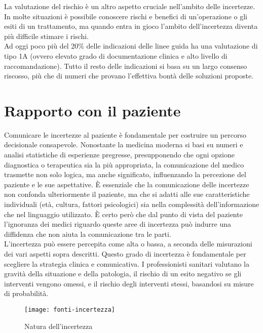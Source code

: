 La valutazione del rischio è un altro aspetto cruciale nell'ambito delle incertezze. In molte situazioni è possibile conoscere rischi e benefici di un'operazione o gli esiti di un trattamento, ma quando entra in gioco l'ambito dell'incertezza diventa più difficile stimare i rischi. \\
Ad oggi poco più del 20\% delle indicazioni delle linee guida ha una valutazione di tipo 1A (ovvero elevato grado di documentazione clinica e alto livello di raccomandazione). Tutto il resto delle indicazioni si basa su un largo consenso riscosso, più che di numeri che provano l'effettiva bontà delle soluzioni proposte. 


\section{Rapporto con il paziente}

Comunicare le incertezze al paziente è fondamentale per costruire un percorso decisionale consapevole. Nonostante la medicina moderna si basi su numeri e analisi statistiche di  esperienze pregresse, presupponendo che ogni opzione diagnostica o terapeutica sia la più appropriata, la comunicazione del medico trasmette non solo logica, ma anche significato, influenzando la percezione del paziente e le sue aspettative. È essenziale che la comunicazione delle incertezze non confonda ulteriormente il paziente, ma che si adatti alle sue caratteristiche individuali (età, cultura, fattori psicologici) sia nella complessità dell'informazione che nel linguaggio utilizzato. È certo però che dal punto di vista del paziente l'ignoranza dei medici riguardo queste aree di incertezza può indurre una diffidenza che non aiuta la comunicazione tra le parti. \\
L'incertezza può essere percepita come alta o bassa, a seconda delle misurazioni dei vari aspetti sopra descritti. Questo grado di incertezza è fondamentale per scegliere la strategia clinica e comunicativa. I professionisti sanitari valutano la gravità della situazione e della patologia, il rischio di un esito negativo se gli interventi vengono omessi, e il rischio degli interventi stessi, basandosi su misure di probabilità.\\

\begin{figure}[!ht] 
    \centering 
    \texttt{[image: fonti-incertezza]} 
    \caption{Natura dell'incertezza}
\end{figure}

